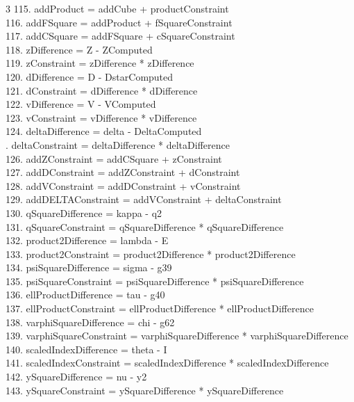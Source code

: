\documentclass[10pt]{article}
\begin{document}
\begin{multicols}{3}
115. addProduct = addCube + productConstraint\\
116. addFSquare = addProduct + fSquareConstraint\\
117. addCSquare = addFSquare + cSquareConstraint\\
118. zDifference = Z - ZComputed\\
119. zConstraint = zDifference * zDifference\\
120. dDifference = D - DstarComputed\\
121. dConstraint = dDifference * dDifference\\
122. vDifference = V - VComputed\\
123. vConstraint = vDifference * vDifference\\
124. deltaDifference = delta - DeltaComputed\\
. deltaConstraint = deltaDifference * deltaDifference\\
126. addZConstraint = addCSquare + zConstraint\\
127. addDConstraint = addZConstraint + dConstraint\\
128. addVConstraint = addDConstraint + vConstraint\\
129. addDELTAConstraint = addVConstraint + deltaConstraint\\
130. qSquareDifference = kappa - q2\\
131. qSquareConstraint = qSquareDifference * qSquareDifference\\
132. product2Difference = lambda - E\\
133. product2Constraint = product2Difference * product2Difference\\
134. psiSquareDifference = sigma - g39\\
135. psiSquareConstraint = psiSquareDifference * psiSquareDifference\\
136. ellProductDifference = tau - g40\\
137. ellProductConstraint = ellProductDifference * ellProductDifference\\
138. varphiSquareDifference = chi - g62\\
139. varphiSquareConstraint = varphiSquareDifference * varphiSquareDifference\\
140. scaledIndexDifference = theta - I\\
141. scaledIndexConstraint = scaledIndexDifference * scaledIndexDifference\\
142. ySquareDifference = nu - y2\\
143. ySquareConstraint = ySquareDifference * ySquareDifference\\

\end{multicols}
\end{document}
